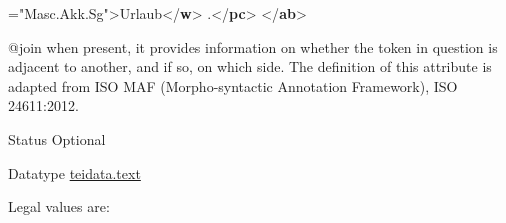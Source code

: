 \begin{reflist}
\begin{sansreflist}
\begin{reflist}
{\hspace*{1em}\hspace*{1em}{msd}="{Masc.Akk.Sg}">}Urlaub{</\textbf{w}>}\mbox{}\newline 
{}.{</\textbf{pc}>}\mbox{}\newline 
{</\textbf{ab}>}
\end{reflist}  
    \item[@join]
  when present, it provides information on whether the token in question is adjacent to another, and if so, on which side. The definition of this attribute is adapted from ISO MAF (Morpho-syntactic Annotation Framework), ISO 24611:2012.
\begin{reflist}
    \item[{Status}]
  Optional
    \item[{Datatype}]
  \hyperref[TEI.teidata.text]{teidata.text}
    \item[{Legal values are:}]
  \begin{description}


\end{description}
\end{reflist}
\end{sansreflist}
\end{reflist}
